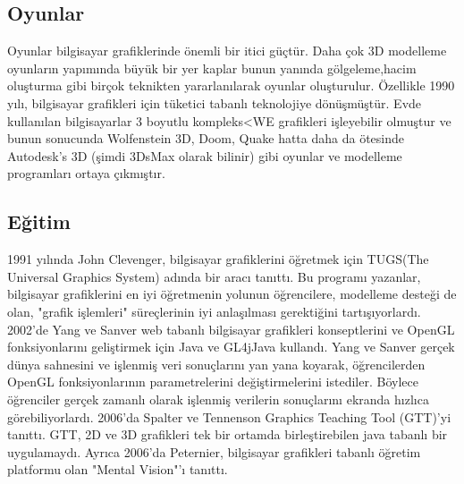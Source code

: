 \documentclass{IEEEtran}
\begin{document}
\subsection{Oyunlar}
Oyunlar bilgisayar grafiklerinde önemli bir itici güçtür. Daha çok 3D modelleme oyunların yapımında büyük bir yer kaplar bunun yanında gölgeleme,hacim oluşturma gibi birçok teknikten yararlanılarak oyunlar oluşturulur. Özellikle 1990 yılı, bilgisayar grafikleri için tüketici tabanlı teknolojiye dönüşmüştür. Evde kullanılan bilgisayarlar 3 boyutlu kompleks<WE grafikleri işleyebilir olmuştur ve bunun sonucunda Wolfenstein 3D, Doom, Quake hatta daha da ötesinde Autodesk's 3D (şimdi 3DsMax olarak bilinir) gibi oyunlar ve modelleme programları ortaya çıkmıştır.\cite{mkl1}

\subsection{Eğitim}
1991 yılında John Clevenger, bilgisayar grafiklerini öğretmek için TUGS(The Universal Graphics System) adında bir aracı tanıttı. Bu programı yazanlar, bilgisayar grafiklerini en iyi öğretmenin yolunun öğrencilere, modelleme desteği de olan, "grafik işlemleri" süreçlerinin iyi anlaşılması gerektiğini tartışıyorlardı. 2002'de Yang ve Sanver web tabanlı bilgisayar grafikleri konseptlerini ve OpenGL fonksiyonlarını geliştirmek için Java ve GL4jJava kullandı. Yang ve Sanver gerçek dünya sahnesini ve işlenmiş veri sonuçlarını yan yana koyarak, öğrencilerden OpenGL fonksiyonlarının parametrelerini değiştirmelerini istediler. Böylece öğrenciler gerçek zamanlı olarak işlenmiş verilerin sonuçlarını ekranda hızlıca görebiliyorlardı. 2006'da Spalter ve Tennenson Graphics Teaching Tool (GTT)'yi tanıttı. GTT, 2D ve 3D grafikleri tek bir ortamda birleştirebilen java tabanlı bir uygulamaydı. Ayrıca 2006'da Peternier, bilgisayar grafikleri tabanlı öğretim platformu olan "Mental Vision"'ı tanıttı.\cite{mkl1}
\end{document}
